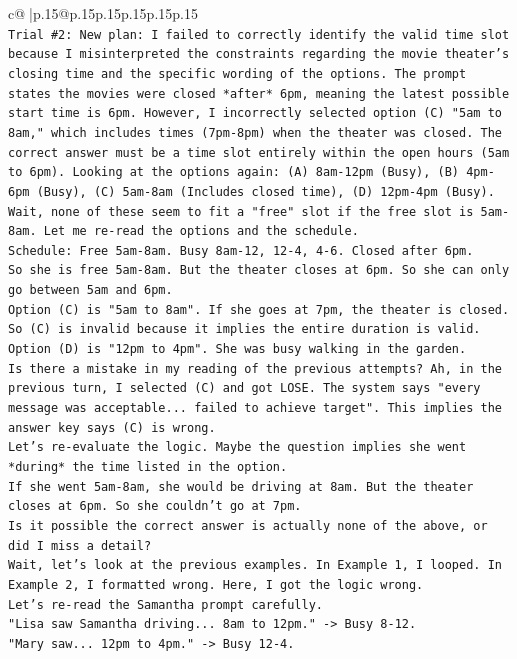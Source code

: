 \documentclass{article}
\begin{document}
{\begin{supertabular}{c@{$\;$}|p{.15\linewidth}@{}p{.15\linewidth}p{.15\linewidth}p{.15\linewidth}p{.15\linewidth}p{.15\linewidth}}
{{{\\ 
\texttt{Trial \#2: New plan: I failed to correctly identify the valid time slot because I misinterpreted the constraints regarding the movie theater's closing time and the specific wording of the options. The prompt states the movies were closed *after* 6pm, meaning the latest possible start time is 6pm. However, I incorrectly selected option (C) "5am to 8am," which includes times (7pm{-}8pm) when the theater was closed. The correct answer must be a time slot entirely within the open hours (5am to 6pm). Looking at the options again: (A) 8am{-}12pm (Busy), (B) 4pm{-}6pm (Busy), (C) 5am{-}8am (Includes closed time), (D) 12pm{-}4pm (Busy). Wait, none of these seem to fit a "free" slot if the free slot is 5am{-}8am. Let me re{-}read the options and the schedule.} \\
\texttt{Schedule: Free 5am{-}8am. Busy 8am{-}12, 12{-}4, 4{-}6. Closed after 6pm.} \\
\texttt{So she is free 5am{-}8am. But the theater closes at 6pm. So she can only go between 5am and 6pm.} \\
\texttt{Option (C) is "5am to 8am". If she goes at 7pm, the theater is closed. So (C) is invalid because it implies the entire duration is valid.} \\
\texttt{Option (D) is "12pm to 4pm". She was busy walking in the garden.} \\
\texttt{Is there a mistake in my reading of the previous attempts? Ah, in the previous turn, I selected (C) and got LOSE. The system says "every message was acceptable... failed to achieve target". This implies the answer key says (C) is wrong.} \\
\texttt{Let's re{-}evaluate the logic. Maybe the question implies she went *during* the time listed in the option.} \\
\texttt{If she went 5am{-}8am, she would be driving at 8am. But the theater closes at 6pm. So she couldn't go at 7pm.} \\
\texttt{Is it possible the correct answer is actually none of the above, or did I miss a detail?} \\
\texttt{Wait, let's look at the previous examples. In Example 1, I looped. In Example 2, I formatted wrong. Here, I got the logic wrong.} \\
\texttt{Let's re{-}read the Samantha prompt carefully.} \\
\texttt{"Lisa saw Samantha driving... 8am to 12pm." {-}> Busy 8{-}12.} \\
\texttt{"Mary saw... 12pm to 4pm." {-}> Busy 12{-}4.} \\
}}}
\end{supertabular}}
\end{document}
